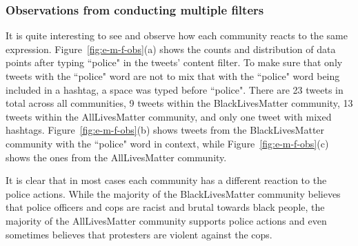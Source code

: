 \subsubsection{Observations from conducting multiple filters}

It is quite interesting to see and observe how each community reacts to the same expression. Figure~\ref{fig:e-m-f-obs}(a) shows the counts and distribution of data points after typing ``police" in the tweets' content filter. To make sure that only tweets with the ``police" word are not to mix that with the ``police" word being included in a hashtag, a space was typed before ``police". There are 23 tweets in total across all communities, 9 tweets within the BlackLivesMatter community, 13 tweets within the AllLivesMatter community, and only one tweet with mixed hashtags. Figure~\ref{fig:e-m-f-obs}(b) shows tweets from 
the BlackLivesMatter community with the ``police" word in context, while Figure~\ref{fig:e-m-f-obs}(c) shows the ones from the AllLivesMatter community. 


It is clear that in most cases each community has a different reaction to the police actions. While the majority of the BlackLivesMatter community believes that police officers and cops are racist and brutal towards black people, the majority of the AllLivesMatter community supports police actions and even sometimes believes that protesters are violent against the cops.   


